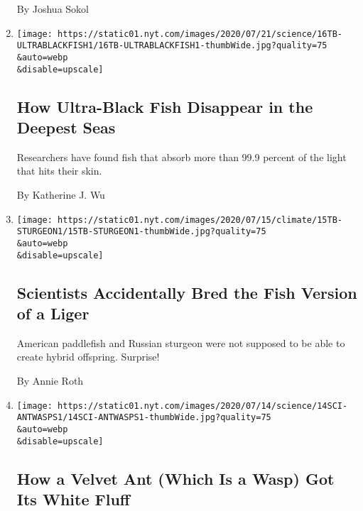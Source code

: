 \begin{enumerate}
  By Joshua Sokol
\item
  \href{/2020/07/16/science/ultra-black-fish.html}{}

  \texttt{[image: https://static01.nyt.com/images/2020/07/21/science/16TB-ULTRABLACKFISH1/16TB-ULTRABLACKFISH1-thumbWide.jpg?quality=75\\\&auto=webp\\\&disable=upscale]}

  \hypertarget{how-ultra-black-fish-disappear-in-the-deepest-seas}{%
  \subsection{How Ultra-Black Fish Disappear in the Deepest
  Seas}\label{how-ultra-black-fish-disappear-in-the-deepest-seas}}

  Researchers have found fish that absorb more than 99.9 percent of the
  light that hits their skin.

  By Katherine J. Wu
\item
  \href{/2020/07/15/science/hybrid-sturgeon-paddlefish.html}{}

  \texttt{[image: https://static01.nyt.com/images/2020/07/15/climate/15TB-STURGEON1/15TB-STURGEON1-thumbWide.jpg?quality=75\\\&auto=webp\\\&disable=upscale]}

  \hypertarget{scientists-accidentally-bred-the-fish-version-of-a-liger}{%
  \subsection{Scientists Accidentally Bred the Fish Version of a
  Liger}\label{scientists-accidentally-bred-the-fish-version-of-a-liger}}

  American paddlefish and Russian sturgeon were not supposed to be able
  to create hybrid offspring. Surprise!

  By Annie Roth
\item
  \href{/2020/07/14/science/white-fluffy-ant-wasp.html}{}

  \texttt{[image: https://static01.nyt.com/images/2020/07/14/science/14SCI-ANTWASPS1/14SCI-ANTWASPS1-thumbWide.jpg?quality=75\\\&auto=webp\\\&disable=upscale]}

  \hypertarget{how-a-velvet-ant-which-is-a-wasp-got-its-white-fluff}{%
  \subsection{How a Velvet Ant (Which Is a Wasp) Got Its White
  Fluff}\label{how-a-velvet-ant-which-is-a-wasp-got-its-white-fluff}}


\end{enumerate}
